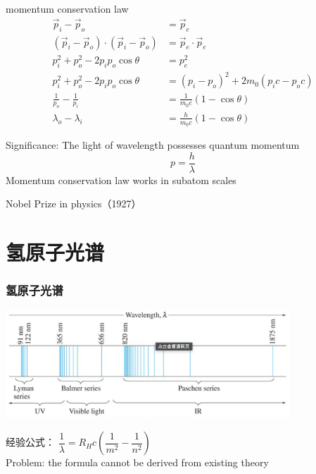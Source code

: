 \begin{frame}  
    momentum conservation law
    \begin{equation*}
        \begin{split}
            \vec{p}_i -\vec{p}_o &= \vec{p}_e \\
            (\vec{p}_i -\vec{p}_o)\cdot (\vec{p}_i -\vec{p}_o)  &= \vec{p}_e\cdot \vec{p}_e   \\
            p_i ^2 + p_o ^2 -2p_i p_o \cos \theta &= p_e ^2  \\
            p_i ^2 + p_o ^2 -2p_i p_o \cos \theta &= (p_i-p_o)^2 +2 m_0 (p_i c-p_o c) \\
            \frac{1}{p_o} -\frac{1}{p_i} &= \frac{1}{m_0 c} (1-\cos \theta) \\
            \lambda_o -\lambda_i &= \frac{h}{m_0 c} (1-\cos \theta) 
        \end{split}
    \end{equation*}
\end{frame}

\begin{frame}   
    \begin{tcolorbox1}{Significance:}
        \bullet The light of wavelength \lambda possesses quantum momentum \[p=\frac{h}{\lambda}\]
        \bullet Momentum conservation law works in subatom scales 
    \end{tcolorbox1}   
    {\color{deepred} Nobel Prize in physics（1927）}\\
\end{frame}

\section{氢原子光谱}
\begin{frame}  
     \frametitle{氢原子光谱}
     \begin{center}
        \includegraphics[width=0.8\textwidth]{figs/hydspe.png}
    \end{center}  
    经验公式：
       $\dfrac{1}{\lambda}=R_H c (\dfrac{1}{m^2} -\dfrac{1}{n^2})$ \\
    \alert{Problem:} the formula cannot be derived from existing theory
\end{frame}

